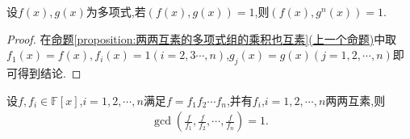 \documentclass[../../main.tex]{subfiles}%
\begin{document}
\begin{corollary}\label{corollary:互素多项式n次方后仍互素}
设$f(x),g(x)$为多项式,若$(f(x),g(x))=1$,则$(f(x),g^n(x))=1$.  
\end{corollary}
\begin{proof}

在\hyperref[proposition:两两互素的多项式组的乘积也互素]{命题\ref{proposition:两两互素的多项式组的乘积也互素}(上一个命题)}中取$f_1(x)=f(x),f_i(x)=1(i=2,3\cdots,n)$,$g_j(x)=g(x)(j=1,2,\cdots,n)$即可得到结论.

\end{proof}

\begin{proposition}\label{proposition:f除以两两互素多项式得到的多项式组互素}
设$f,f_i\in \mathbb{F}[x]$,$i=1,2,\cdots,n$满足$f=f_1f_2\cdots f_n$,并有$f_i$,$i=1,2,\cdots,n$两两互素,则
\begin{align*}
\gcd\left( \frac{f}{f_1},\frac{f}{f_2},\cdots ,\frac{f}{f_n} \right) =1.
\end{align*}
\end{proposition}
\end{document}
